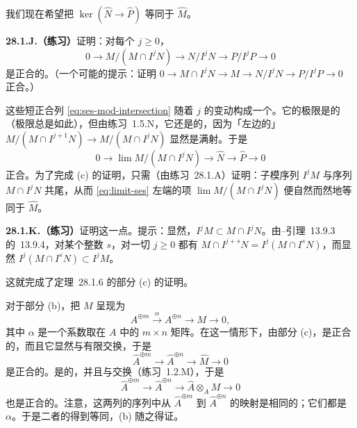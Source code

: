 我们现在希望把 $\ker(\hat{N}\to\hat{P})$ 等同于 $\hat{M}$。

\textbf{28.1.J.（练习）}\quad 证明：对每个 $j\ge 0$，
\begin{equation*}
\tag{28.1.7.3}\label{eq:ses-mod-intersection}
0\longrightarrow M/(M\cap I^jN)\longrightarrow N/I^jN\longrightarrow P/I^jP\longrightarrow 0
\end{equation*}
是正合的。（一个可能的提示：证明 $0\to M\cap I^jN\to M\to N/I^jN\to P/I^jP\to 0$ 正合。）

这些短正合列 \eqref{eq:ses-mod-intersection} 随着 $j$ 的变动构成一个\trInverseSystem。它的极限是\trLeftExact{}的（极限总是如此），但由\mbox{练习~1.5.N}，它还是\trRightExact{}的，因为「左边的\trTransitionMap{}」$M/(M\cap I^{j+1}N)\to M/(M\cap I^jN)$ 显然是满射。于是
\begin{equation*}
\tag{28.1.7.4}\label{eq:limit-ses}
0\longrightarrow \lim M/(M\cap I^jN)\longrightarrow \hat{N}\longrightarrow \hat{P}\longrightarrow 0
\end{equation*}
正合。为了完成 (c) 的证明，只需（由\mbox{练习~28.1.A}）证明：子模序列 $I^jM$ 与序列 $M\cap I^jN$ 共尾，从而 \eqref{eq:limit-ses} 左端的项 $\lim M/(M\cap I^jN)$ 便自然而然地等同于 $\hat{M}$。

\textbf{28.1.K.（练习）}\quad 证明这一点。提示：显然，$I^jM\subset M\cap I^jN$。由\trArtin--\trRees{}引理~13.9.3 的\trCorollary{}~13.9.4，对某个整数 $s$，对一切 $j\ge 0$ 都有 $M\cap I^{j+s}N=I^j(M\cap I^sN)$，而显然 $I^j(M\cap I^sN)\subset I^jM$。

这就完成了\mbox{定理~28.1.6} 的部分 (c) 的证明。

对于部分 (b)，把 $M$ 呈现为
\begin{equation*}
\tag{28.1.7.5}\label{eq:presentation-of-m}
A^{\oplus m}\xrightarrow{\ \alpha\ }A^{\oplus n}\longrightarrow M\longrightarrow 0,
\end{equation*}
其中 $\alpha$ 是一个系数取在 $A$ 中的 $m\times n$ 矩阵。在这一情形下，由部分 (c)，\trCompletion{}是正合的，而且它显然与有限\trDirectSum{}交换，于是
\[
\hat{A}^{\oplus m}\longrightarrow \hat{A}^{\oplus n}\longrightarrow \hat{M}\longrightarrow 0
\]
是正合的。\trTensorProduct{}是\trRightExact{}的，并且与\trDirectSum{}交换（\mbox{练习~1.2.M}），于是
\[
\hat{A}^{\oplus m}\longrightarrow \hat{A}^{\oplus n}\longrightarrow \hat{A}\otimes_A M\longrightarrow 0
\]
也是正合的。注意，这两列\trRightExact{}的序列中从 $\hat{A}^{\oplus m}$ 到 $\hat{A}^{\oplus n}$ 的映射是相同的；它们都是 $\alpha$。于是二者的\trCokernel{}得到等同，(b) 随之得证。

